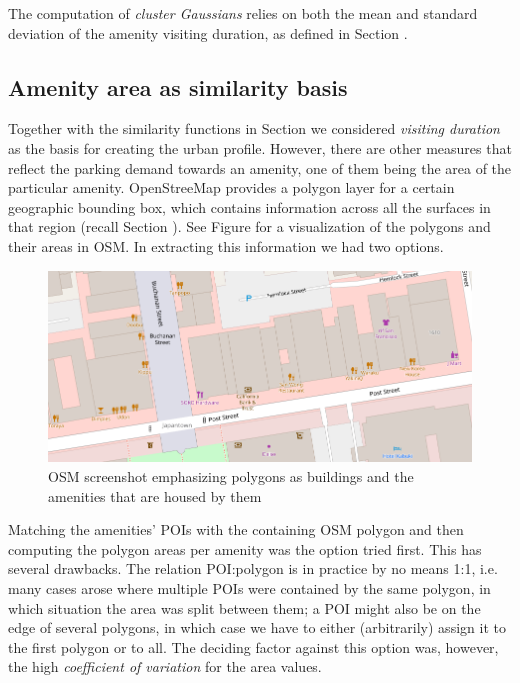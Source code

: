 The computation of \textit{cluster Gaussians} relies on both the mean and standard deviation of the amenity visiting duration, as defined in Section .

\subsection{Amenity area as similarity basis}
\label{experimental_setup:amenity_area}
Together with the similarity functions in Section  we considered \textit{visiting duration} as the basis for creating the urban profile. However, there are other measures that reflect the parking demand towards an amenity, one of them being the area of the particular amenity. OpenStreeMap provides a polygon layer for a certain geographic bounding box, which contains information across all the surfaces in that region (recall Section ). See Figure  for a visualization of the polygons and their areas in OSM. In extracting this information we had two options. 

\begin{figure}[!ht]
	\centering
	\includegraphics[width=\textwidth]{graphics/amenity_polygons4.png}
	\caption{OSM screenshot emphasizing polygons as buildings and the amenities that are housed by them}
	\label{fig:amenity_polygons}
\end{figure}

Matching the amenities' POIs with the containing OSM polygon and then computing the polygon areas per amenity was the option tried first. This has several drawbacks. The relation POI:polygon is in practice by no means 1:1, i.e. many cases arose where multiple POIs were contained by the same polygon, in which situation the area was split between them; a POI might also be on the edge of several polygons, in which case we have to either (arbitrarily) assign it to the first polygon or to all. The deciding factor against this option was, however, the high \textit{coefficient of variation} for the area values. 

